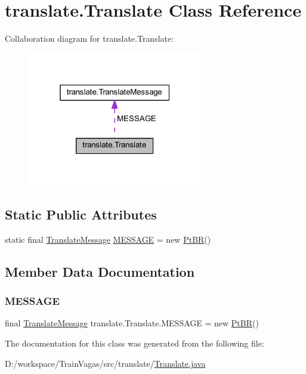\hypertarget{classtranslate_1_1_translate}{}\section{translate.\+Translate Class Reference}
\label{classtranslate_1_1_translate}


Collaboration diagram for translate.\+Translate\+:\nopagebreak
\begin{figure}[H]
\begin{center}
\leavevmode
\includegraphics[width=217pt]{classtranslate_1_1_translate__coll__graph}
\end{center}
\end{figure}
\subsection*{Static Public Attributes}
\begin{DoxyCompactItemize}
\item 
static final \hyperlink{interfacetranslate_1_1_translate_message}{Translate\+Message} \hyperlink{classtranslate_1_1_translate_a77789a4a25073f41053f245f7894f60f}{M\+E\+S\+S\+A\+GE} = new \hyperlink{classtranslate_1_1_pt_b_r}{Pt\+BR}()
\end{DoxyCompactItemize}


\subsection{Member Data Documentation}
\mbox{\label{classtranslate_1_1_translate_a77789a4a25073f41053f245f7894f60f}} 
\subsubsection{\texorpdfstring{M\+E\+S\+S\+A\+GE}{MESSAGE}}
{\footnotesize\ttfamily final \hyperlink{interfacetranslate_1_1_translate_message}{Translate\+Message} translate.\+Translate.\+M\+E\+S\+S\+A\+GE = new \hyperlink{classtranslate_1_1_pt_b_r}{Pt\+BR}()\hspace{0.3cm}{\ttfamily [static]}}



The documentation for this class was generated from the following file\+:\begin{DoxyCompactItemize}
\item 
D\+:/workspace/\+Train\+Vagas/src/translate/\hyperlink{_translate_8java}{Translate.\+java}\end{DoxyCompactItemize}
